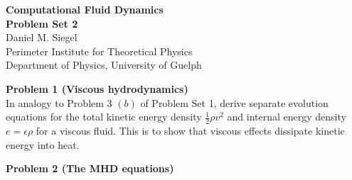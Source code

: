 \documentclass[letter,11pt]{article}
\begin{document}
\pagestyle{problem_set}


\phantom{.}
\begin{center}
{\Large\textbf{Computational Fluid Dynamics\\[0.4cm] Problem Set 2}} \\[0.7cm]
Daniel M. Siegel \\[0.1cm]
Perimeter Institute for Theoretical Physics\\
Department of Physics, University of Guelph
\end{center}

\vspace{1cm}

{\noindent\large\textbf{Problem 1 (Viscous hydrodynamics)}}\\[0.1cm]

\noindent In analogy to Problem 3 $(b)$ of Problem Set 1, derive separate evolution equations for the total kinetic energy density $\frac{1}{2}\rho v^2$ and internal energy density $e=\epsilon\rho$ for a viscous fluid. This is to show that viscous effects dissipate kinetic energy into heat.

\vspace{1cm}

{\noindent\large\textbf{Problem 2 (The MHD equations)}}\\[-0.4cm]
\end{document}
